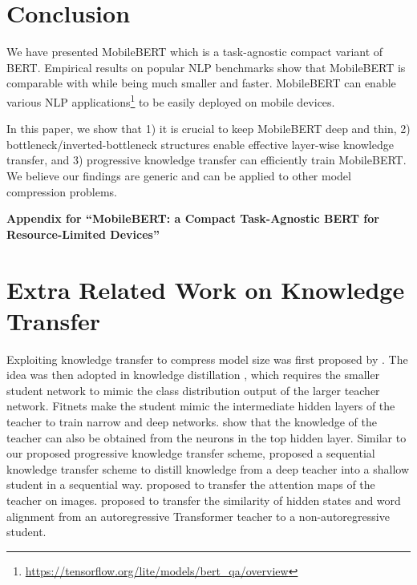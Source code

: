 \documentclass[11pt,a4paper]{article}
\begin{document}
\section{Conclusion}



We have presented MobileBERT which is a task-agnostic compact variant of BERT. Empirical results on popular NLP benchmarks show that MobileBERT is comparable with  while being much smaller and faster. MobileBERT can enable various NLP applications\footnote{\url{https://tensorflow.org/lite/models/bert_qa/overview}} to be easily deployed on mobile devices.

In this paper, we show that 1) it is crucial to keep MobileBERT deep and thin, 2) bottleneck/inverted-bottleneck structures enable effective layer-wise knowledge transfer, and 3) progressive knowledge transfer can efficiently train MobileBERT. We believe our findings are generic and can be applied to other model compression problems.










\appendix

\begin{center}
{\bf \large{
    Appendix for ``MobileBERT: a Compact Task-Agnostic BERT for Resource-Limited Devices''}}
\end{center}

\section{Extra Related Work on Knowledge Transfer}

Exploiting knowledge transfer to compress model size was first proposed by \citet{bucilua2006model}. 
The idea was then adopted in knowledge distillation \citep{hinton2015distilling}, which requires the smaller student network to mimic the class distribution output of the larger teacher network. Fitnets \citep{romero2014fitnets} make the student mimic the intermediate hidden layers of the teacher to train narrow and deep networks. \citet{luo2016face} show that the knowledge of the teacher can also be obtained from the neurons in the top hidden layer. Similar to our proposed progressive knowledge transfer scheme, \citet{yeo2018sequential} proposed a sequential knowledge transfer scheme to distill knowledge from a deep teacher into a shallow student in a sequential way. \citet{zagoruyko2016paying} proposed to transfer the attention maps of the teacher on images. \citet{li2018hint} proposed to transfer the similarity of hidden states and word alignment from an autoregressive Transformer teacher to a non-autoregressive student.
\end{document}
